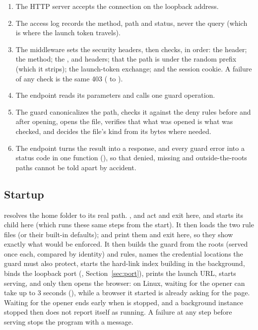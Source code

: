 \begin{enumerate}
  \item The HTTP server accepts the connection on the loopback address.
  \item The access log records the method, path and status, never the query
        (which is where the launch token travels).
  \item The middleware sets the security headers, then checks, in order: the
         header; the method; the ,  and
         headers; that the path is under the random prefix
        (which it strips); the launch-token exchange; and the session cookie.  A
        failure of any check is the same 403 ( to ).
  \item The endpoint reads its parameters and calls one guard operation.
  \item The guard canonicalizes the path, checks it against the deny rules before and
        after opening, opens the file, verifies that what was opened is what was
        checked, and decides the file's kind from its bytes where needed.
  \item The endpoint turns the result into a response, and every guard error into a
        status code in one function (), so that denied, missing and
        outside-the-roots paths cannot be told apart by accident.
\end{enumerate}

\subsection{Startup}

 resolves the home folder to its real path.  ,
 and  act and exit here, and  starts
its child here (which runs these same steps from the start).  It then loads the two
rule files (or their built-in defaults);  and 
print them and exit here, so they show exactly what would be enforced.  It then builds the guard from the roots (served once each, compared by
identity) and rules, names the credential locations the guard must also protect,
starts the hard-link index building in the background, binds the loopback port
(, Section~\ref{sec:port}), prints the launch URL, starts serving,
and only then opens the browser: on Linux, waiting for the opener can take up to
3 seconds (), while a browser it started is already asking for the
page.  Waiting for the opener ends early when  is stopped, and a background
instance stopped then does not report itself as running.  A failure at any step
before serving stops the program with a message.

